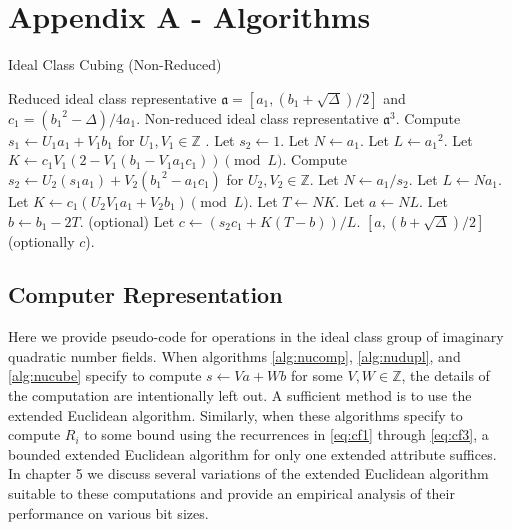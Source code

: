 \documentclass{ucalgthes1}
\theoremstyle{plain}
\theoremstyle{definition}
\newcommand{\ZZ}{\mathbb{Z}}
\begin{document}
\chapter*{Appendix A - Algorithms}

\begin{algorithm}[h]
\caption{Ideal Class Cubing (Non-Reduced)}
\label{alg:idealCube}
\begin{algorithmic}[1]
\REQUIRE Reduced ideal class representative $\mathfrak a = \left[a_1, (b_1 + \sqrt\Delta)/2\right]$ and $c_1 = ({b_1}^2-\Delta)/4a_1$.
\ENSURE Non-reduced ideal class representative ${\mathfrak a}^3$.
\STATE Compute $s_1 \leftarrow U_1a_1 + V_1b_1$ for $U_1,V_1 \in \ZZ$ .
	\STATE Let $s_2 \leftarrow 1$.
	\STATE Let $N \leftarrow a_1$.
	\STATE Let $L \leftarrow {a_1}^2$.
	\STATE Let $K \leftarrow c_1V_1(2-V_1(b_1-V_1a_1c_1)) \pmod L$.
\ELSE
	\STATE Compute $s_2 \leftarrow U_2(s_1a_1) + V_2({b_1}^2-a_1c_1)$ for $U_2, V_2 \in \ZZ$.
	\STATE Let $N \leftarrow a_1/s_2$.
	\STATE Let $L \leftarrow Na_1$.
	\STATE Let $K \leftarrow c_1(U_2V_1a_1+V_2b_1) \pmod L$.
\ENDIF
\STATE Let $T \leftarrow NK$.
\STATE Let $a \leftarrow NL$.
\STATE Let $b \leftarrow b_1 - 2T$.
\STATE (optional) Let $c \leftarrow (s_2c_1+K(T-b))/L$.
\RETURN $[a, (b+\sqrt\Delta)/2]$ (optionally $c$).
\end{algorithmic}
\end{algorithm}




\bigbreak
\section{Computer Representation}
\label{section:computerRepresentation}

Here we provide pseudo-code for operations in the ideal class group of imaginary quadratic number fields.  When algorithms \ref{alg:nucomp}, \ref{alg:nudupl}, and \ref{alg:nucube} specify to compute $s \leftarrow Va + Wb$ for some $V,W \in \ZZ$, the details of the computation are intentionally left out.  A sufficient method is to use the extended Euclidean algorithm.  Similarly, when these algorithms specify to compute $R_i$ to some bound using the recurrences in \eqref{eq:cf1} through \eqref{eq:cf3}, a bounded extended Euclidean algorithm for only one extended attribute suffices. In chapter 5 we discuss several variations of the extended Euclidean algorithm suitable to these computations and provide an empirical analysis of their performance on various bit sizes.
\end{document}

